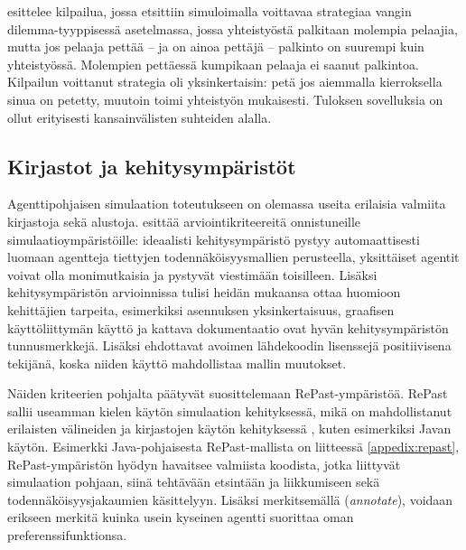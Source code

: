 \documentclass[finnish,gradu,twoside,12pt]{tktltiki}
\begin{document}
{\citet{Axelrod01031980} esittelee kilpailua, jossa etsittiin simuloimalla voittavaa strategiaa vangin dilemma-tyyppisessä asetelmassa, jossa yhteistyöstä palkitaan molempia pelaajia, mutta jos pelaaja pettää -- ja on ainoa pettäjä -- palkinto on suurempi kuin yhteistyössä. Molempien pettäessä kumpikaan pelaaja ei saanut palkintoa. Kilpailun voittanut strategia oli yksinkertaisin: petä jos aiemmalla kierroksella sinua on petetty, muutoin toimi yhteistyön mukaisesti. Tuloksen sovelluksia on ollut erityisesti kansainvälisten suhteiden alalla.

\subsection*{Kirjastot ja kehitysympäristöt}

Agenttipohjaisen simulaation toteutukseen on olemassa useita erilaisia valmiita kirjastoja sekä alustoja. \cite{Tobias2004} esittää arviointikriteereitä onnistuneille simulaatioympäristöille: ideaalisti kehitysympäristö pystyy automaattisesti luomaan agentteja tiettyjen todennäköisyysmallien perusteella, yksittäiset agentit voivat olla monimutkaisia ja pystyvät viestimään toisilleen. Lisäksi kehitysympäristön arvioinnissa tulisi heidän mukaansa ottaa huomioon kehittäjien tarpeita, esimerkiksi asennuksen yksinkertaisuus, graafisen käyttöliittymän käyttö ja kattava dokumentaatio ovat hyvän kehitysympäristön tunnusmerkkejä. Lisäksi \citet{Tobias2004} ehdottavat avoimen lähdekoodin lisenssejä positiivisena tekijänä, koska niiden käyttö mahdollistaa mallin muutokset.

Näiden kriteerien pohjalta \citet{Tobias2004} päätyvät suosittelemaan RePast-ympäristöä. RePast sallii useamman kielen käytön simulaation kehityksessä, mikä on mahdollistanut erilaisten välineiden ja kirjastojen käytön kehityksessä \cite{North2006}, kuten esimerkiksi Javan käytön. Esimerkki Java-pohjaisesta RePast-mallista on liitteessä \ref{appedix:repast}, RePast-ympäristön hyödyn havaitsee valmiista koodista, jotka liittyvät simulaation pohjaan, siinä tehtävään etsintään ja liikkumiseen sekä todennäköisyysjakaumien käsittelyyn. Lisäksi merkitsemällä (\textit{annotate}), voidaan erikseen merkitä kuinka usein kyseinen agentti suorittaa oman preferenssifunktionsa.


}
\end{document}

